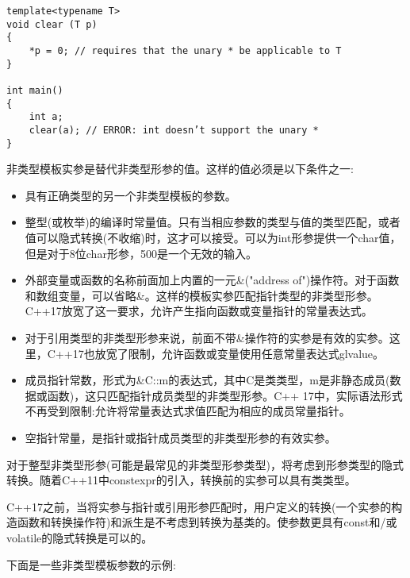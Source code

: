 \begin{lstlisting}[style=styleCXX]
template<typename T>
void clear (T p)
{
	*p = 0; // requires that the unary * be applicable to T
}

int main()
{
	int a;
	clear(a); // ERROR: int doesn’t support the unary *
}
\end{lstlisting}


非类型模板实参是替代非类型形参的值。这样的值必须是以下条件之一:

\begin{itemize}
\item 
具有正确类型的另一个非类型模板的参数。

\item
整型(或枚举)的编译时常量值。只有当相应参数的类型与值的类型匹配，或者值可以隐式转换(不收缩)时，这才可以接受。可以为int形参提供一个char值，但是对于8位char形参，500是一个无效的输入。

\item 
外部变量或函数的名称前面加上内置的一元\&("address of")操作符。对于函数和数组变量，可以省略\&。这样的模板实参匹配指针类型的非类型形参。C++17放宽了这一要求，允许产生指向函数或变量指针的常量表达式。

\item 
对于引用类型的非类型形参来说，前面不带\&操作符的实参是有效的实参。这里，C++17也放宽了限制，允许函数或变量使用任意常量表达式glvalue。

\item 
成员指针常数，形式为\&C::m的表达式，其中C是类类型，m是非静态成员(数据或函数)，这只匹配指针成员类型的非类型形参。C++ 17中，实际语法形式不再受到限制:允许将常量表达式求值匹配为相应的成员常量指针。

\item 
空指针常量，是指针或指针成员类型的非类型形参的有效实参。
\end{itemize}

对于整型非类型形参(可能是最常见的非类型形参类型)，将考虑到形参类型的隐式转换。随着C++11中constexpr的引入，转换前的实参可以具有类类型。

C++17之前，当将实参与指针或引用形参匹配时，用户定义的转换(一个实参的构造函数和转换操作符)和派生是不考虑到转换为基类的。使参数更具有const和/或volatile的隐式转换是可以的。

下面是一些非类型模板参数的示例:


